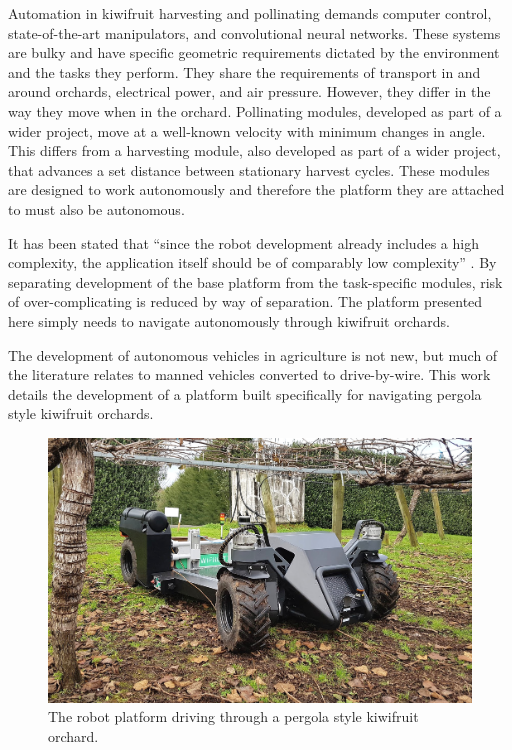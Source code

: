 \documentclass[preprint,authoryear,12pt]{elsarticle}
\begin{document}
    Automation in kiwifruit harvesting and pollinating demands computer control, state-of-the-art manipulators, and convolutional neural networks.
    These systems are bulky and have specific geometric requirements dictated by the environment and the tasks they perform.
    They share the requirements of transport in and around orchards, electrical power, and air pressure.
    However, they differ in the way they move when in the orchard.
    Pollinating modules, developed as part of a wider project, move at a well-known velocity with minimum changes in angle.
    This differs from a harvesting module, also developed as part of a wider project, that advances a set distance between stationary harvest cycles.
    These modules are designed to work autonomously and therefore the platform they are attached to must also be autonomous.

    It has been stated that ``since the robot development already includes a high complexity, the application itself should be of comparably low complexity'' \citep{Ruckelshausen2009}.
    By separating development of the base platform from the task-specific modules, risk of over-complicating is reduced by way of separation.
    The platform presented here simply needs to navigate autonomously through kiwifruit orchards.

    The development of autonomous vehicles in agriculture is not new, but much of the literature relates to manned vehicles converted to drive-by-wire.
    This work details the development of a platform built specifically for navigating pergola style kiwifruit orchards.

    \begin{figure}[htb]
        \centering
        \includegraphics[width=\linewidth]{imgs/photos/suzy_general.jpg}
        \caption{
            The robot platform driving through a pergola style kiwifruit orchard.
        }
        \label{fig:suzy}
    \end{figure}
\end{document}
